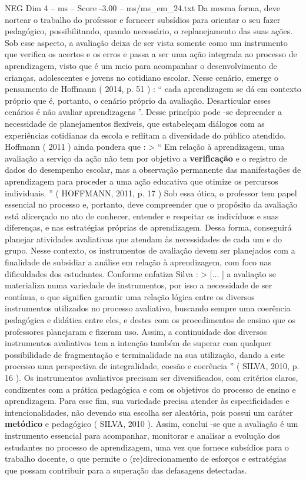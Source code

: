 \begin{textsample}{NEG Dim 4 – ms – Score -3.00 – ms/ms\_em\_24.txt}
Da mesma forma, deve nortear o trabalho do professor e fornecer subsídios para orientar o seu fazer pedagógico, possibilitando, quando necessário, o replanejamento das suas ações.
Sob esse aspecto, a avaliação deixa de ser vista somente como um instrumento que verifica os acertos e os erros e passa a ser uma ação integrada ao processo de aprendizagem, visto que é um meio para acompanhar o desenvolvimento de crianças, adolescentes e jovens no cotidiano escolar.
Nesse cenário, emerge o pensamento de Hoffmann ( 2014, p. 51 ) : “ cada aprendizagem se dá em contexto próprio que é, portanto, o cenário próprio da avaliação.
Desarticular esses cenários é não avaliar aprendizagens ”.
Desse princípio pode -se depreender a necessidade de planejamentos flexíveis, que estabeleçam diálogos com as experiências cotidianas da escola e reflitam a diversidade do público atendido.
Hoffmann ( 2011 ) ainda pondera que : > “ Em relação à aprendizagem, uma avaliação a serviço da ação não tem por objetivo a \textbf{verificação} e o registro de dados do desempenho escolar, mas a observação permanente das manifestações de aprendizagem para proceder a uma ação educativa que otimize os percursos individuais. ” ( HOFFMANN, 2011, p. 17 ) Sob essa ótica, o professor tem papel essencial no processo e, portanto, deve compreender que o propósito da avaliação está alicerçado no ato de conhecer, entender e respeitar os indivíduos e suas diferenças, e nas estratégias próprias de aprendizagem.
Dessa forma, conseguirá planejar atividades avaliativas que atendam às necessidades de cada um e do grupo.
Nesse contexto, os instrumentos de avaliação devem ser planejados com a finalidade de subsidiar a análise em relação à aprendizagem, com foco nas dificuldades dos estudantes.
Conforme enfatiza Silva : > [... ] a avaliação se materializa numa variedade de instrumentos, por isso a necessidade de ser contínua, o que significa garantir uma relação lógica entre os diversos instrumentos utilizados no processo avaliativo, buscando sempre uma coerência pedagógica e didática entre eles, e destes com os procedimentos de ensino que os professores planejaram e fizeram uso.
Assim, a continuidade dos diversos instrumentos avaliativos tem a intenção também de superar com qualquer possibilidade de fragmentação e terminalidade na sua utilização, dando a este processo uma perspectiva de integralidade, coesão e coerência ” ( SILVA, 2010, p. 16 ).
Os instrumentos avaliativos precisam ser diversificados, com critérios claros, condizentes com a prática pedagógica e com os objetivos do processo de ensino e aprendizagem.
Para esse fim, sua variedade precisa atender às especificidades e intencionalidades, não devendo sua escolha ser aleatória, pois possui um caráter \textbf{metódico} e pedagógico ( SILVA, 2010 ).
Assim, conclui -se que a avaliação é um instrumento essencial para acompanhar, monitorar e analisar a evolução dos estudantes no processo de aprendizagem, uma vez que fornece subsídios para o trabalho docente, o que permite o (re)direcionamento de esforços e estratégias que possam contribuir para a superação das defasagens detectadas.

\end{textsample}
